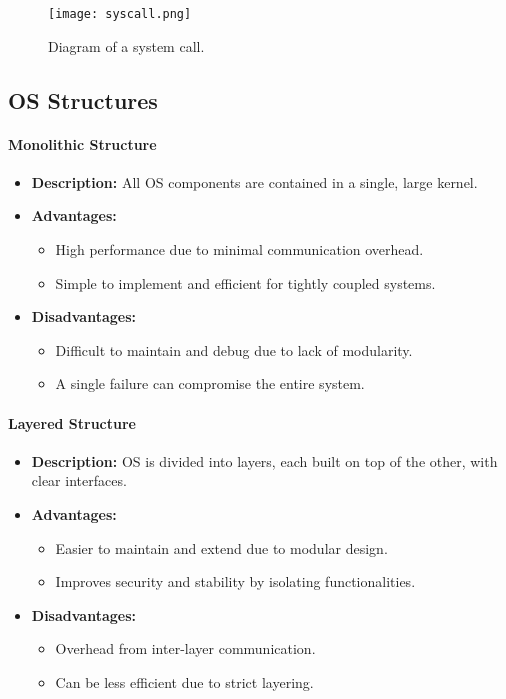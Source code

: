 \begin{figure}[H]
    \centering
    \texttt{[image: syscall.png]}
    \caption{Diagram of a system call.}
    \label{fig:syscall}
\end{figure}


\subsection{OS Structures}

\paragraph{Monolithic Structure}
\begin{itemize}
    \item \textbf{Description:} All OS components are contained in a single, large kernel.
    \item \textbf{Advantages:}
    \begin{itemize}
        \item High performance due to minimal communication overhead.
        \item Simple to implement and efficient for tightly coupled systems.
    \end{itemize}
    \item \textbf{Disadvantages:}
    \begin{itemize}
        \item Difficult to maintain and debug due to lack of modularity.
        \item A single failure can compromise the entire system.
    \end{itemize}
\end{itemize}

\paragraph{Layered Structure}
\begin{itemize}
    \item \textbf{Description:} OS is divided into layers, each built on top of the other, with clear interfaces.
    \item \textbf{Advantages:}
    \begin{itemize}
        \item Easier to maintain and extend due to modular design.
        \item Improves security and stability by isolating functionalities.
    \end{itemize}
    \item \textbf{Disadvantages:}
    \begin{itemize}
        \item Overhead from inter-layer communication.
        \item Can be less efficient due to strict layering.
    \end{itemize}
\end{itemize}

